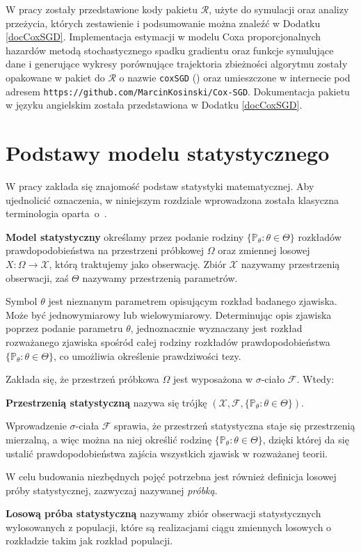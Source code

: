 W pracy zostały przedstawione kody pakietu $\mathcal{R}$, użyte do symulacji oraz analizy przeżycia, których zestawienie i podsumowanie można znaleźć w Dodatku \ref{docCoxSGD}. Implementacja estymacji w modelu Coxa proporcjonalnych hazardów metodą stochastycznego spadku gradientu oraz funkcje symulujące dane i generujące wykresy porównujące trajektoria zbieżności algorytmu zostały opakowane w pakiet do $\mathcal{R}$ o nazwie \texttt{coxSGD} (\cite{kosa0}) oraz umieszczone w internecie pod adresem \texttt{https://github.com/MarcinKosinski/Cox-SGD}. Dokumentacja pakietu w języku angielskim została przedstawiona w Dodatku \ref{docCoxSGD}.

\chapter*{Podstawy modelu statystycznego}

W pracy zakłada się znajomość podstaw statystyki matematycznej. Aby ujednolicić oznaczenia, w niniejszym rozdziale wprowadzona została klasyczna terminologia oparta~o~\cite{niemiro}.

\begin{definition}
\textbf{Model statystyczny} określamy przez podanie rodziny $\{ \mathbb P_{\theta}:\theta\in\Theta\} $ rozkładów prawdopodobieństwa na przestrzeni próbkowej $\Omega$ oraz zmiennej losowej $X : \Omega \rightarrow \mathcal{X}$, którą traktujemy jako obserwację. Zbiór $\mathcal{X}$ nazywamy przestrzenią obserwacji, zaś $\Theta$ nazywamy przestrzenią parametrów. \\
\end{definition}
Symbol $\theta$ jest nieznanym parametrem opisującym rozkład badanego zjawiska. Może być jednowymiarowy lub wielowymiarowy. Determinując opis zjawiska poprzez podanie parametru $\theta$, jednoznacznie wyznaczany jest rozkład rozważanego zjawiska spośród całej rodziny rozkładów prawdopodobieństwa $\{ \mathbb P_{\theta}:\theta\in\Theta\}$, co umożliwia określenie prawdziwości tezy.
\par
Zakłada się, że przestrzeń próbkowa $\Omega$ jest wyposażona w $\sigma$-ciało $\mathcal{F}$. Wtedy:
\begin{definition}
\textbf{Przestrzenią statystyczną} nazywa się trójkę $(\mathcal{X},\mathcal{F},\{\mathbb P_{\theta}:\theta\in\Theta\})$.
\end{definition}
Wprowadzenie $\sigma$-ciała $\mathcal{F}$ sprawia, że przestrzeń statystyczna staje się przestrzenią mierzalną, a więc można na niej określić rodzinę $\{ \mathbb P_{\theta}:\theta\in\Theta\} $, dzięki której da się ustalić prawdopodobieństwa zajścia wszystkich zjawisk w rozważanej teorii.

W celu budowania niezbędnych pojęć potrzebna jest również definicja losowej próby statystycznej, zazwyczaj nazywanej \textit{próbką}.

\begin{definition}
 \textbf{Losową próba statystyczną} nazywamy zbiór obserwacji statystycznych wylosowanych z populacji, które są realizacjami ciągu zmiennych losowych o rozkładzie takim jak rozkład populacji.
 \end{definition}
